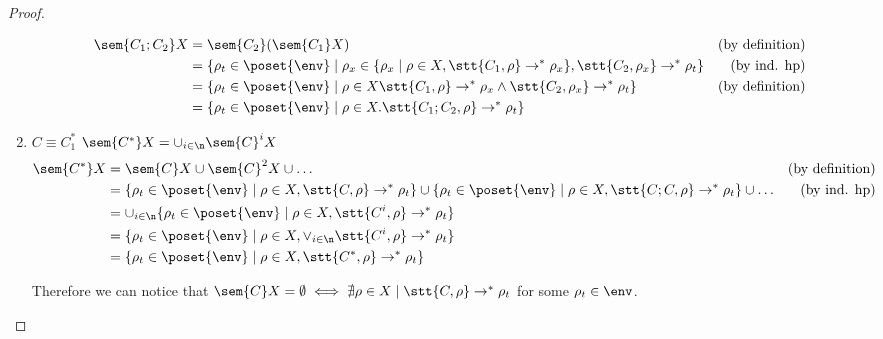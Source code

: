 \begin{proof}
\begin{enumerate}
\begin{align*}
      \sem{C_1;C_2}X & = \sem{C_2}(\sem{C_1}X) & \text{(by definition)}\\
      & = \{\rho_t \in\poset{\env} \mid \rho_x \in \{\rho_x \mid \rho \in X, \stt{C_1, \rho}  \to^* \rho_x\}, \stt{C_2, \rho_x} \to^* \rho_t\} & \text{(by ind. hp)}\\
      & = \{\rho_t \in\poset{\env} \mid \rho \in X \stt{C_1, \rho} \to^* \rho_x \wedge \stt{C_2, \rho_x} \to^* \rho_t\} & \text{(by definition)}\\
      & = \{\rho_t \in\poset{\env} \mid \rho \in X . \stt{C_1;C_2, \rho} \to^* \rho_t\}
    \end{align*}
  \item \(C \equiv C_1^*\) \(\sem{C^*}X = \cup_{i\in\n}\sem{C}^i X\)
    \begin{align*}
      \sem{C^*}X & = \sem{C}X \cup \sem{C}^2X \cup \dots & \text{(by definition)}\\
      & = \{\rho_t \in\poset{\env} \mid \rho \in X, \stt{C,\rho} \to^* \rho_t\} \cup \{\rho_t \in\poset{\env} \mid \rho \in X, \stt{C;C,\rho} \to^* \rho_t\} \cup \dots & \text{(by ind. hp)}\\
      & = \cup_{i\in\n} \{\rho_t \in\poset{\env} \mid \rho \in X, \stt{C^i, \rho} \to^*  \rho_t\} \\
      & = \{\rho_t \in\poset{\env} \mid \rho \in X, \vee_{i\in\n} \stt{C^i, \rho} \to^* \rho_t\} \\
      & = \{\rho_t \in\poset{\env} \mid \rho \in X, \stt{C^*, \rho} \to^* \rho_t\}
    \end{align*}

    Therefore we can notice that \(\sem{C}X = \emptyset \iff
    \nexists \rho \in X \mid \stt{C,\rho} \to^* \rho_t\) for some
    \(\rho_t\in\env\).
  \end{enumerate}
\end{proof}
